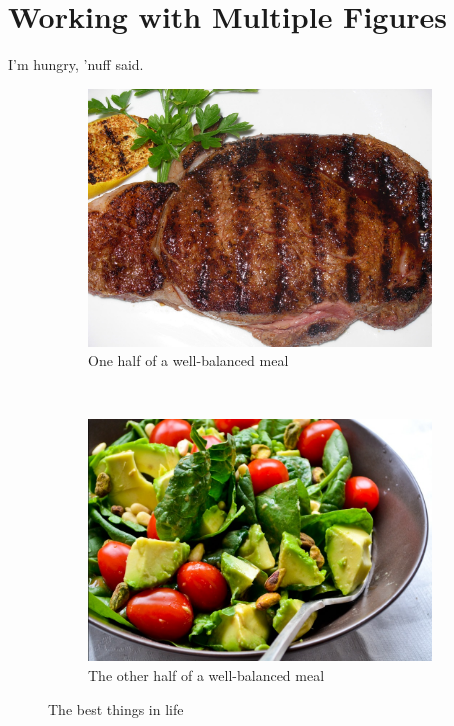 \documentclass[12pt]{article}
\begin{document}
\section{Working with Multiple Figures}
I'm hungry, 'nuff said.
\begin{figure}[H]
  \centering

  \begin{subfigure}[h!]{0.4\textwidth}
    \includegraphics[width=\textwidth]{ribeye.jpg}
    \caption{One half of a well-balanced meal}
  \end{subfigure}
  ~
  \begin{subfigure}[h!]{0.4\textwidth}
    \includegraphics[width=\textwidth]{salad.jpg}
    \caption{The other half of a well-balanced meal}
  \end{subfigure}
  \caption{The best things in life}

\end{figure}
\end{document}
